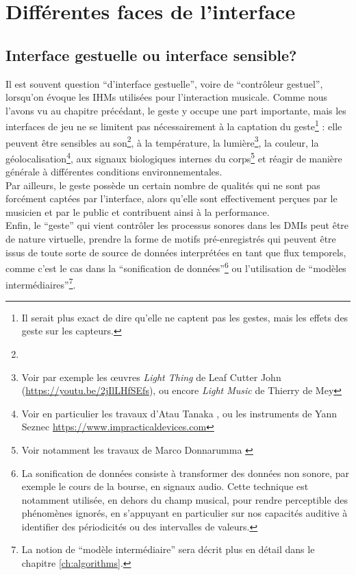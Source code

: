 \section{Différentes faces de l'interface}

\subsection{Interface gestuelle ou interface sensible?}


\noindent Il est souvent question ``d'interface gestuelle'', voire de ``contrôleur gestuel'', lorsqu'on évoque les \glspl{IHM} utilisées pour l'interaction musicale. Comme nous l'avons vu au chapitre précédant, le geste y occupe une part importante, mais les interfaces de jeu ne se limitent pas nécessairement à la captation du geste\footnote{Il serait plus exact de dire qu'elle ne captent pas les gestes, mais les effets des geste sur les capteurs.} : elle peuvent être sensibles au son\footnote{}, à la température, la lumière\footnote{Voir par exemple les œuvres \textit{Light Thing} de Leaf Cutter John (\url{https://youtu.be/2jIlLHfSEfs}), ou encore \textit{Light Music} de Thierry de Mey}, la couleur, la géolocalisation\footnote{Voir en particulier les travaux d'Atau Tanaka \cite{tanaka_mobile_2004}, ou les instruments de Yann Seznec \url{https://www.impracticaldevices.com}}, aux signaux biologiques internes du corps\footnote{Voir notamment les travaux de Marco Donnarumma \cite{donnarumma_biophysical_2017}} et réagir de manière générale à différentes conditions environnementales.\\
\indent Par ailleurs, le geste possède un certain nombre de qualités qui ne sont pas forcément captées par l'interface, alors qu'elle sont effectivement perçues par le musicien et par le public et contribuent ainsi à la performance.\\
\indent Enfin, le ``geste'' qui vient contrôler les processus sonores dans les \glspl{DMI} peut être de nature virtuelle, prendre la forme de motifs pré-enregistrés qui peuvent être issus de toute sorte de source de données interprétées en tant que flux temporels, comme c'est le cas dans la ``sonification de données''\footnote{La sonification de données consiste à transformer des données non sonore, par exemple le cours de la bourse, en signaux audio. Cette technique est notamment utilisée, en dehors du champ musical, pour rendre perceptible des phénomènes ignorés, en s'appuyant en particulier sur nos capacités auditive à identifier des périodicités ou des intervalles de valeurs.} ou l'utilisation de ``modèles intermédiaires''\footnote{La notion de ``modèle intermédiaire'' sera décrit plus en détail dans le chapitre \ref{ch:algorithms}.}.\\

